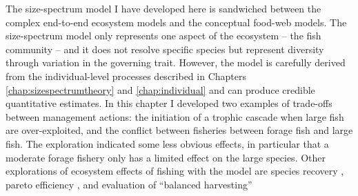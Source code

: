 The size-spectrum model I have developed here is sandwiched between the complex end-to-end ecosystem models and the conceptual food-web models.  The size-spectrum model only represents one aspect of the ecosystem -- the fish community -- and it does not resolve specific species but represent diversity through variation in the governing trait.  However, the model is carefully derived from the individual-level processes described in Chapters \ref{chap:sizespectrumtheory} and \ref{chap:individual} and can produce credible quantitative estimates.  In this chapter I developed two examples of trade-offs between management actions: the initiation of a trophic cascade when large fish are over-exploited, and the conflict between fisheries between forage fish and large fish.  The exploration indicated some less obvious effects, in particular that a moderate forage fishery only has a limited effect on the large species.  Other explorations of ecosystem effects of fishing with the model are species recovery \citep{Andersen2010b}, pareto efficiency \citep{Jacobsen2017}, and evaluation of ``balanced harvesting'' \citep{Jacobsen2014, Kolding2016}

